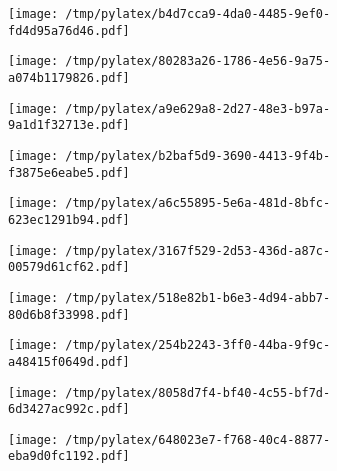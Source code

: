 \documentclass{article}
\begin{document}
\begin{figure}[htbp]
\begin{subfigure}[b]{.3\linewidth}
\texttt{[image: /tmp/pylatex/b4d7cca9-4da0-4485-9ef0-fd4d95a76d46.pdf]}
\end{subfigure}
\begin{subfigure}[b]{.3\linewidth}
\texttt{[image: /tmp/pylatex/80283a26-1786-4e56-9a75-a074b1179826.pdf]}
\end{subfigure}
\begin{subfigure}[b]{.3\linewidth}
\texttt{[image: /tmp/pylatex/a9e629a8-2d27-48e3-b97a-9a1d1f32713e.pdf]}
\end{subfigure}
\begin{subfigure}[b]{.3\linewidth}
\texttt{[image: /tmp/pylatex/b2baf5d9-3690-4413-9f4b-f3875e6eabe5.pdf]}
\end{subfigure}
\begin{subfigure}[b]{.3\linewidth}
\texttt{[image: /tmp/pylatex/a6c55895-5e6a-481d-8bfc-623ec1291b94.pdf]}
\end{subfigure}
\begin{subfigure}[b]{.3\linewidth}
\texttt{[image: /tmp/pylatex/3167f529-2d53-436d-a87c-00579d61cf62.pdf]}
\end{subfigure}
\begin{subfigure}[b]{.3\linewidth}
\texttt{[image: /tmp/pylatex/518e82b1-b6e3-4d94-abb7-80d6b8f33998.pdf]}
\end{subfigure}
\begin{subfigure}[b]{.3\linewidth}
\texttt{[image: /tmp/pylatex/254b2243-3ff0-44ba-9f9c-a48415f0649d.pdf]}
\end{subfigure}
\begin{subfigure}[b]{.3\linewidth}
\texttt{[image: /tmp/pylatex/8058d7f4-bf40-4c55-bf7d-6d3427ac992c.pdf]}
\end{subfigure}
\begin{subfigure}[b]{.3\linewidth}
\texttt{[image: /tmp/pylatex/648023e7-f768-40c4-8877-eba9d0fc1192.pdf]}
\end{subfigure}
\end{figure}
\end{document}
